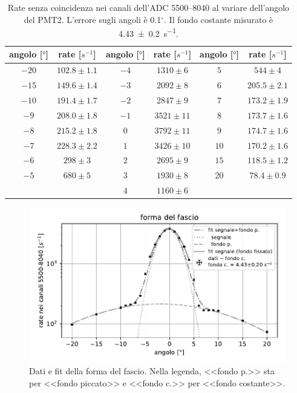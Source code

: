 \begin{table}
	\centering

	\begin{tabular}{cc|cc|cc}
		\toprule
		angolo [$\si{\degree}$] & rate [$\si{s^{-1}}$] & angolo [$\si{\degree}$] & rate [$\si{s^{-1}}$] & angolo [$\si{\degree}$] & rate [$\si{s^{-1}}$] \\
		\midrule
			$-20$ & $102.8 \pm 1.1$ & $-4$ & $1310 \pm 6$  & $5$ & $544 \pm 4$       \\
			$-15$ & $149.6 \pm 1.4$ & $-3$ & $2092 \pm 8$  & $6$ & $205.5 \pm 2.1$   \\
			$-10$ & $191.4 \pm 1.7$ & $-2$ & $2847 \pm 9$  & $7$ & $173.2 \pm 1.9$   \\
			$-9$ & $208.0 \pm 1.8$  & $-1$ & $3521 \pm 11$ & $8$ & $173.7 \pm 1.6$   \\
			$-8$ & $215.2 \pm 1.8$  & $0$ & $3792 \pm 11$  & $9$ & $174.7 \pm 1.6$   \\
			$-7$ & $228.3 \pm 2.2$  & $1$ & $3426 \pm 10$  & $10$ & $170.2 \pm 1.6$  \\
			$-6$ & $298 \pm 3$      & $2$ & $2695 \pm 9$   & $15$ & $118.5 \pm 1.2$  \\
			$-5$ & $680 \pm 5$      & $3$ & $1930 \pm 8$   & $20$ & $78.4 \pm 0.9$   \\
			     &                  & $4$ & $1160 \pm 6$   &      &\\
		 \bottomrule
	\end{tabular}

	\caption{Rate senza coincidenza nei canali dell'ADC 5500--8040
	al variare dell'angolo del PMT2.
	L'errore sugli angoli è 0.1$^{\circ}$.
	Il fondo costante misurato è \SI{4.43\pm0.2}{s^{-1}}.}
	\label{tabfo}
\end{table}

\begin{figure}
	\centering
	\includegraphics[width=32em]{forma}
	\caption{Dati e fit della forma del fascio.
	Nella legenda, <<fondo p.>> sta per <<fondo piccato>> e <<fondo c.>> per <<fondo costante>>.}
	\label{forma}
\end{figure}

